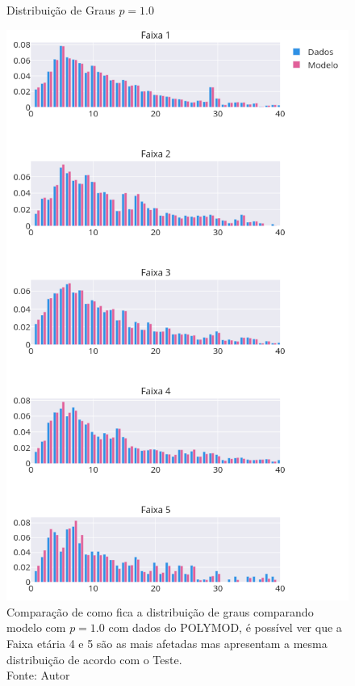 \begin{figure}[H]
    \centering
    \captionsetup{font=normalsize,skip=0.8pt,singlelinecheck=on,labelsep=endash}
    \caption{Distribuição de Graus $p = 1.0$}
    \includegraphics[scale= 0.4]{figuras/comparacao.png}
    \captionsetup{font=small,justification=justified}
    \caption*{Comparação de como fica a distribuição de graus comparando modelo com $p = 1.0$ com dados do POLYMOD, é possível ver que a Faixa etária 4 e 5 são as mais afetadas mas apresentam a mesma distribuição de acordo com o Teste.\\Fonte: Autor}
    \label{fig:comparacao}
\end{figure}

